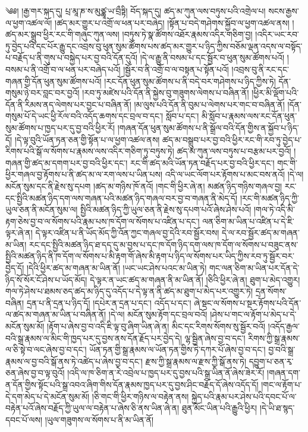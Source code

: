 ༄༅། །རྒྱ་གར་སྐད་དུ། པྲ་མཱ་ཎ་ས་མུཙྪཱ་ཡ་བྲྀཏྟི། བོད་སྐད་དུ། ཚད་མ་ཀུན་ལས་བཏུས་པའི་འགྲེལ་པ། སངས་རྒྱས་ལ་ཕྱག་འཚལ་ལོ། །ཚད་མར་གྱུར་པ་འགྲོ་ལ་ཕན་པར་བཞེད། །སྟོན་པ་བདེ་གཤེགས་སྐྱོབ་ལ་ཕྱག་འཚལ་ནས། །ཚད་མར་སྒྲུབ་ཕྱིར་རང་གི་གཞུང་ཀུན་ལས། །བཏུས་ཏེ་སྣ་ཚོགས་འཐོར་རྣམས་འདིར་གཅིག་བྱ། །འདིར་ཡང་རབ་ཏུ་བྱེད་པའི་དང་པོར་རྒྱུ་དང་འབྲས་བུ་ཕུན་སུམ་ཚོགས་པས་ཚད་མར་གྱུར་པ་ཉིད་ཀྱིས་བཅོམ་ལྡན་འདས་ལ་བསྟོད་པ་བརྗོད་པ་ནི་གུས་པ་བསྐྱེད་པར་བྱ་བའི་དོན་དུའོ། །དེ་ལ་རྒྱུ་ནི་བསམ་པ་དང་སྦྱོར་བ་ཕུན་སུམ་ཚོགས་པའོ། །བསམ་པ་ནི་འགྲོ་བ་ལ་ཕན་པར་བཞེད་པའོ། །སྦྱོར་བ་ནི་འགྲོ་བ་ལ་བསྟན་པ་སྟོན་པའོ། །འབྲས་བུ་ནི་རང་དང་གཞན་གྱི་དོན་ཕུན་སུམ་ཚོགས་པའོ། །རང་དོན་ཕུན་སུམ་ཚོགས་པ་ནི་བདེ་བར་གཤེགས་པ་ཉིད་ཀྱིས་ཏེ། དོན་གསུམ་ཉེ་བར་བླང་བར་བྱའོ། །རབ་ཏུ་མཛེས་པའི་དོན་ནི་སྐྱེས་བུ་གཟུགས་ལེགས་པ་བཞིན་ནོ། །ཕྱིར་མི་ལྡོག་པའི་དོན་ནི་རིམས་ནད་ལེགས་པར་བྱང་པ་བཞིན་ནོ། །མ་ལུས་པའི་དོན་ནི་བུམ་པ་ལེགས་པར་གང་བ་བཞིན་ནོ། །དོན་གསུམ་པོ་དེ་ཡང་ཕྱི་རོལ་བའི་འདོད་ཆགས་དང་བྲལ་བ་དང་། སློབ་པ་དང་། མི་སློབ་པ་རྣམས་ལས་རང་དོན་ཕུན་སུམ་ཚོགས་པ་ཁྱད་པར་དུ་བྱ་བའི་ཕྱིར་རོ། །གཞན་དོན་ཕུན་སུམ་ཚོགས་པ་ནི་སྒྲོལ་བའི་དོན་གྱིས་ན་སྐྱོབ་པ་ཉིད་དོ། །དེ་ལྟ་བུའི་ཡོན་ཏན་ཅན་གྱི་སྟོན་པ་ལ་ཕྱག་འཚལ་ནས། ཚད་མ་བསྒྲུབ་པར་བྱ་བའི་ཕྱིར་རང་གི་རབ་ཏུ་བྱེད་པ་རིགས་པའི་སྒོ་ལ་སོགས་པ་རྣམས་ལས་འདིར་གཅིག་ཏུ་བཏུས་ཏེ། ཚད་མ་ཀུན་ལས་བཏུས་པ་བརྩམ་པར་བྱའོ། །གཞན་གྱི་ཚད་མ་དགག་པར་བྱ་བའི་ཕྱིར་དང་། རང་གི་ཚད་མའི་ཡོན་ཏན་བརྗོད་པར་བྱ་བའི་ཕྱིར་དང་། གང་གི་ཕྱིར་གཞལ་བྱ་རྟོགས་པ་ནི་ཚད་མ་ལ་རག་ལས་པ་ཡིན་པས། འདི་ལ་ཡང་ལོག་པར་རྟོགས་པ་མང་བས་ནའོ། །དེ་ལ། མངོན་སུམ་དང་ནི་རྗེས་སུ་དཔག །ཚད་མ་གཉིས་ཁོ་ནའོ། །གང་གི་ཕྱིར་ཞེ་ན། མཚན་ཉིད་གཉིས་གཞལ་བྱ། རང་དང་སྤྱིའི་མཚན་ཉིད་དག་ལས་གཞན་པའི་མཚན་ཉིད་གཞལ་བར་བྱ་བ་གཞན་ནི་མེད་དོ། །རང་གི་མཚན་ཉིད་ཀྱི་ཡུལ་ཅན་ནི་མངོན་སུམ་ལ། སྤྱིའི་མཚན་ཉིད་ཀྱི་ཡུལ་ཅན་ནི་རྗེས་སུ་དཔག་པའོ་ཞེས་ཤེས་པའོ། །གལ་ཏེ་འདི་མི་རྟག་ཅེས་བྱ་བ་ལ་སོགས་པའི་རྣམ་པས་ཁ་དོག་ལ་སོགས་པ་འཛིན་པ་དང་། ལན་ཅིག་མ་ཡིན་པ་འཛིན་པ་དེ་ཇི་ལྟར་ཞེ་ན། དེ་ལྟར་འཛིན་པ་ནི་ཡོད་མོད་ཀྱི་འོན་ཀྱང་གཞལ་བྱ་དེའི་རབ་སྦྱོར་བས། དེ་ལ་རབ་སྦྱོར་ཚད་མ་གཞན་མ་ཡིན། རང་དང་སྤྱིའི་མཚན་ཉིད་ཐ་དད་དུ་མ་བྱས་པ་དང་ཁ་དོག་ཉིད་དག་ལས་ཁ་དོག་ལ་སོགས་པ་བཟུང་ནས་སྤྱིའི་མཚན་ཉིད་ནི་ཁ་དོག་ལ་སོགས་པ་མི་རྟག་གོ་ཞེས་མི་རྟག་པ་ཉིད་ལ་སོགས་པར་ཡིད་ཀྱིས་རབ་ཏུ་སྦྱོར་བར་བྱེད་དོ། །དེའི་ཕྱིར་ཚད་མ་གཞན་མ་ཡིན་ནོ། །ཡང་ཡང་ཤེས་པའང་མ་ཡིན་ཏེ། གང་ལན་ཅིག་མ་ཡིན་པར་དོན་དེ་ཉིད་སོ་སོར་ངོ་ཤེས་པ་ཡོད་མོད། དེ་ལྟར་ན་ཡང་ཚད་མ་གཞན་ནི་མ་ཡིན་ནོ། །ཅིའི་ཕྱིར་ཞེ་ན། ཐུག་པ་མེད་འགྱུར། གལ་ཏེ་ཤེས་པ་ཐམས་ཅད་ཚད་མ་ཉིད་དུ་འདོད་པ་དེ་ལྟ་ན་ནི་ཚད་མ་ཐུག་པ་མེད་པར་འགྱུར་ཏེ། དྲན་སོགས་བཞིན། དྲན་པ་ནི་དྲན་པ་ཉིད་དོ། །དཔེར་ན་དྲན་པ་དང་། འདོད་པ་དང་། ཞེ་སྡང་ལ་སོགས་པ་སྔར་རྟོགས་པའི་དོན་ལ་ཚད་མ་གཞན་མ་ཡིན་པ་བཞིན་ནོ། །དེ་ལ། མངོན་སུམ་རྟོག་དང་བྲལ་བའོ། །ཤེས་པ་གང་ལ་རྟོག་པ་མེད་པ་དེ་མངོན་སུམ་མོ། །རྟོག་པ་ཞེས་བྱ་བ་འདི་ཇི་ལྟ་བུ་ཞིག་ཡིན་ཞེ་ན། མིང་དང་རིགས་སོགས་སུ་སྦྱོར་བའོ། །འདོད་རྒྱལ་བའི་སྒྲ་རྣམས་ལ་མིང་གི་ཁྱད་པར་དུ་བྱས་ནས་དོན་རྗོད་པར་བྱེད་དེ། ལྷ་སྦྱིན་ཞེས་བྱ་བ་དང་། རིགས་ཀྱི་སྒྲ་རྣམས་ལ་ཅི་སྟེ་བ་ལང་ཞེས་བྱ་བ་དང་། ཡོན་ཏན་གྱི་སྒྲ་རྣམས་ལ་ཡོན་ཏན་གྱིས་ཏེ་དཀར་པོ་ཞེས་བྱ་བ་དང་། བྱ་བའི་སྒྲ་རྣམས་ལ་བྱ་བའི་སྒོ་ནས་ཏེ་འཚེད་པ་ཞེས་བྱ་བ་དང་། རྫས་ཀྱི་སྒྲ་རྣམས་ལ་རྫས་ཀྱི་སྒོ་ནས་ཏེ། དབྱུག་པ་ཅན་རྭ་ཅན་ཞེས་བྱ་བ་ལྟ་བུའོ། །འདི་ལ་ཁ་ཅིག་ན་རེ་འབྲེལ་པ་ཁྱད་པར་དུ་བྱས་པའི་སྒྲ་ཡིན་ནོ་ཞེས་ཟེར་རོ། །གཞན་དག་ན་དོན་གྱིས་སྟོང་པའི་སྒྲ་འབའ་ཞིག་གིས་དོན་རྣམས་ཁྱད་པར་དུ་བྱས་ཤིང་བརྗོད་དོ་ཞེས་འདོད་དོ། །གང་ལ་རྟོག་པ་དེ་དག་མེད་པ་དེ་མངོན་སུམ་མོ། །ཅི་གང་གི་ཕྱིར་གཉིས་ལ་བརྟེན་ནས། སྐྱེད་པའི་རྣམ་པར་ཤེས་པའི་དབང་པོ་ལ་བརྟེན་པའོ་ཞེས་བརྗོད་ཀྱི་ཡུལ་ལ་བརྟེན་པ་ཞེས་ཅི་ནས་ཡིན་ཞེ་ན། ཐུན་མོང་ཡིན་པའི་རྒྱུའི་ཕྱིར། །དེ་ཡི་ཐ་སྙད་དབང་པོ་ལས། །ཡུལ་གཟུགས་ལ་སོགས་པ་ནི་མ་ཡིན་ནོ། 